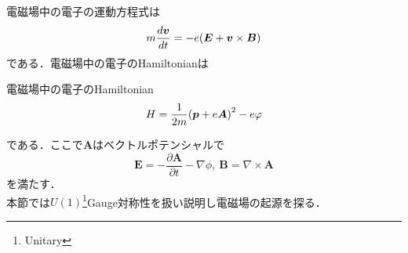 \documentclass{report}
\begin{document}
  電磁場中の電子の運動方程式は
  \begin{equation}
    m\frac{d\bm{v}}{dt}=-e\qty(\bm{E}+\bm{v}\times\bm{B})
  \end{equation}
  である．電磁場中の電子のHamiltonianは
  \begin{itembox}[l]{電磁場中の電子のHamiltonian}
    \begin{equation}
      H=\frac{1}{2m}\qty(\bm{p}+e\bm{A})^2-e\varphi
    \end{equation}
  \end{itembox}
  である．ここで$\bm{A}$はベクトルポテンシャルで
  \begin{equation}
    \bm{E}=-\frac{\partial \bm{A}}{\partial t}-\nabla\phi,\ \bm{B}=\nabla\times\bm{A}
  \end{equation}
  を満たす．\\
  本節では$U(1)$\footnote{Unitary}Gauge対称性を扱い説明し電磁場の起源を探る．
\end{document}
